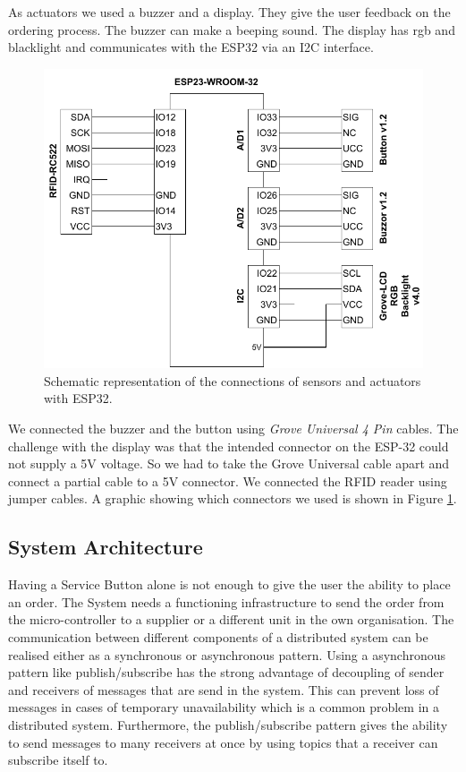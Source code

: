 As actuators we used a buzzer and a display. They give the user feedback on the ordering process. The buzzer can make a beeping sound. The display has rgb and blacklight and communicates with the ESP32 via an I2C interface.

\begin{figure}
    \center
    \includegraphics[width=\linewidth]{figures/schematics.drawio.pdf}
    \caption{Schematic representation of the connections of sensors and actuators with ESP32.}
    \label{fig:schematics}
\end{figure}

We connected the buzzer and the button using \textit{Grove Universal 4 Pin} cables. The challenge with the display was that the intended connector on the ESP-32 could not supply a 5V voltage. So we had to take the Grove Universal cable apart and connect a partial cable to a 5V connector. We connected the RFID reader using jumper cables. A graphic showing which connectors we used is shown in Figure \ref{fig:schematics}.


\subsection{System Architecture}
\label{sec:Technologies:Architecture}

Having a Service Button alone is not enough to give the user the ability to place an order. The System needs a functioning infrastructure to send the order from the micro-controller to a supplier or a different unit in the own organisation. The communication between different components of a distributed system can be realised either as a synchronous or asynchronous pattern. Using a asynchronous pattern like publish/subscribe has the strong advantage of decoupling of sender and receivers of messages that are send in the system. This can prevent loss of messages in cases of temporary unavailability which is a common problem in a distributed system. Furthermore, the publish/subscribe pattern gives the ability to send messages to many receivers at once by using topics that a receiver can subscribe itself to. \cite{Adryan:TechFound-Network:2017}

